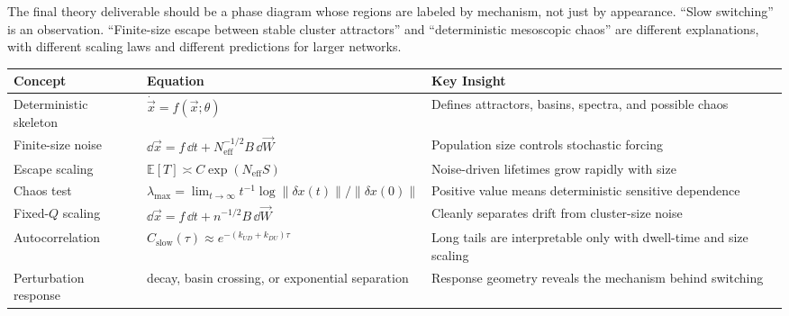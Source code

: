 The final theory deliverable should be a phase diagram whose regions are labeled by mechanism, not just by appearance. ``Slow switching'' is an observation. ``Finite-size escape between stable cluster attractors'' and ``deterministic mesoscopic chaos'' are different explanations, with different scaling laws and different predictions for larger networks.

\begin{chaptersummary}

\begin{center}
\renewcommand{\arraystretch}{1.45}
\begin{tabularx}{\textwidth}{@{}l X X@{}}
  \toprule
  \textbf{Concept} & \textbf{Equation} & \textbf{Key Insight} \\
  \midrule
  Deterministic skeleton &
  $\dot{\vec x}=f(\vec x;\theta)$ &
  Defines attractors, basins, spectra, and possible chaos \\
  Finite-size noise &
  $\dd\vec x=f\,\dd t+N_{\mathrm{eff}}^{-1/2}B\,\dd\vec W$ &
  Population size controls stochastic forcing \\
  Escape scaling &
  $\mathbb{E}[T]\asymp C\exp(N_{\mathrm{eff}}S)$ &
  Noise-driven lifetimes grow rapidly with size \\
  Chaos test &
  $\lambda_{\max}=\lim_{t\to\infty}t^{-1}\log\|\delta x(t)\|/\|\delta x(0)\|$ &
  Positive value means deterministic sensitive dependence \\
  Fixed-$Q$ scaling &
  $\dd\vec x=f\,\dd t+n^{-1/2}B\,\dd\vec W$ &
  Cleanly separates drift from cluster-size noise \\
  Autocorrelation &
  $C_{\mathrm{slow}}(\tau)\approx e^{-(k_{UD}+k_{DU})\tau}$ &
  Long tails are interpretable only with dwell-time and size scaling \\
  Perturbation response &
  decay, basin crossing, or exponential separation &
  Response geometry reveals the mechanism behind switching \\
  \bottomrule
\end{tabularx}
\end{center}

\end{chaptersummary}

